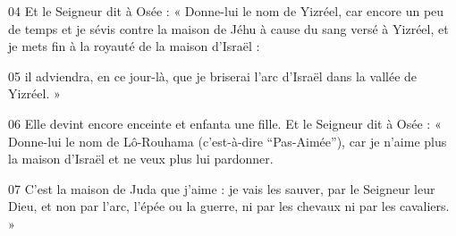 
04 Et le Seigneur dit à Osée : « Donne-lui le nom de Yizréel, car encore un peu de temps et je sévis contre la maison de Jéhu à cause du sang versé à Yizréel, et je mets fin à la royauté de la maison d’Israël :

05 il adviendra, en ce jour-là, que je briserai l’arc d’Israël dans la vallée de Yizréel. »

06 Elle devint encore enceinte et enfanta une fille. Et le Seigneur dit à Osée : « Donne-lui le nom de Lô-Rouhama (c’est-à-dire “Pas-Aimée”), car je n’aime plus la maison d’Israël et ne veux plus lui pardonner.

07 C’est la maison de Juda que j’aime : je vais les sauver, par le Seigneur leur Dieu, et non par l’arc, l’épée ou la guerre, ni par les chevaux ni par les cavaliers. »

